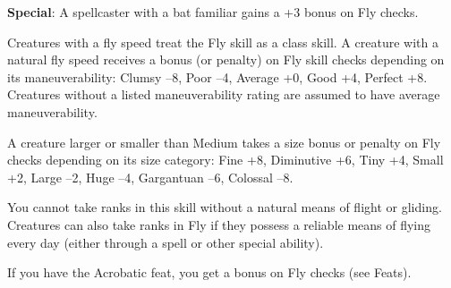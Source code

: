 \textbf{Special}: A spellcaster with a bat familiar gains a +3 bonus on Fly checks.
				
Creatures with a fly speed treat the Fly skill as a class skill. A creature with a natural fly speed receives a bonus (or penalty) on Fly skill checks depending on its maneuverability: Clumsy --8, Poor --4, Average +0, Good +4, Perfect +8. Creatures without a listed maneuverability rating are assumed to have average maneuverability.
				
A creature larger or smaller than Medium takes a size bonus or penalty on Fly checks depending on its size category: Fine +8, Diminutive +6, Tiny +4, Small +2, Large --2, Huge --4, Gargantuan --6, Colossal --8.
				
You cannot take ranks in this skill without a natural means of flight or gliding. Creatures can also take ranks in Fly if they possess a reliable means of flying every day (either through a spell or other special ability).
				
If you have the Acrobatic feat, you get a bonus on Fly checks (see Feats).
        	

